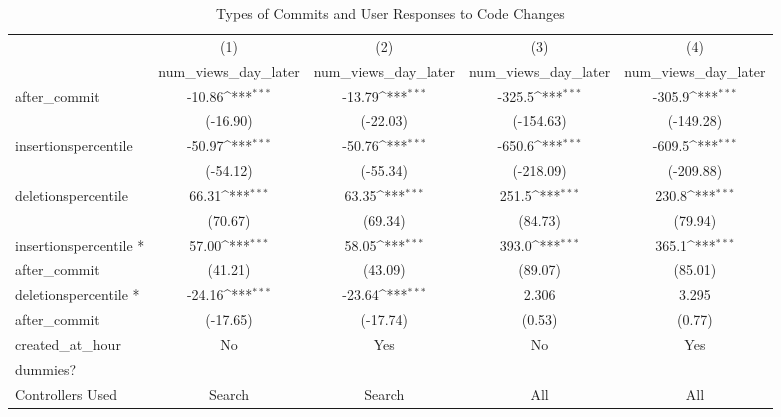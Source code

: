 \documentclass[12pt]{article}
\begin{document}
\begin{table}
\centering
\caption{Types of Commits and User Responses to Code Changes}
{
    \def\sym#1{\ifmmode^{#1}\else\(^{#1}\)\fi}
    \begin{tabular}{l*{4}{c}}
    \hline\hline
        &\multicolumn{1}{c}{(1)}&\multicolumn{1}{c}{(2)}&\multicolumn{1}{c}{(3)}&\multicolumn{1}{c}{(4)}\\
        &\multicolumn{1}{c}{num\_views\_day\_later}&\multicolumn{1}{c}{num\_views\_day\_later}&\multicolumn{1}{c}{num\_views\_day\_later}&\multicolumn{1}{c}{num\_views\_day\_later}\\
        \hline
        after\_commit&      -10.86\sym{***}&      -13.79\sym{***}&      -325.5\sym{***}&      -305.9\sym{***}\\
        &    (-16.90)         &    (-22.03)         &   (-154.63)         &   (-149.28)         \\
        [1em]
        insertionspercentile&      -50.97\sym{***}&      -50.76\sym{***}&      -650.6\sym{***}&      -609.5\sym{***}\\
        &    (-54.12)         &    (-55.34)         &   (-218.09)         &   (-209.88)         \\
        [1em]
        deletionspercentile&       66.31\sym{***}&       63.35\sym{***}&       251.5\sym{***}&       230.8\sym{***}\\
        &     (70.67)         &     (69.34)         &     (84.73)         &     (79.94)         \\
        [1em]
        insertionspercentile *&       57.00\sym{***}&       58.05\sym{***}&       393.0\sym{***}&       365.1\sym{***}\\
        after\_commit&     (41.21)         &     (43.09)         &     (89.07)         &     (85.01)         \\
        [1em]
        deletionspercentile * &      -24.16\sym{***}&      -23.64\sym{***}&       2.306         &       3.295         \\
        after\_commit&    (-17.65)         &    (-17.74)         &      (0.53)         &      (0.77)         \\
        [1em]
        created\_at\_hour&      No               &    Yes &          No           &     Yes\\
        dummies?&                     &            &                     &      \\
        [1em]
        Controllers Used&      Search               &    Search &         All           &     All\\

\end{tabular}}
\end{table}
\end{document}
